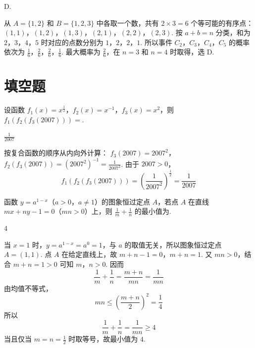 \begin{answer}
D.
\end{answer}

\begin{solution}
从 \(A=\{1,2\}\) 和 \(B=\{1,2,3\}\) 中各取一个数，共有 \(2\times3=6\) 个等可能的有序点：
\((1,1)\)，\((1,2)\)，\((1,3)\)，\((2,1)\)，\((2,2)\)，\((2,3)\).
按 \(a+b=n\) 分类，和为 \(2\)，\(3\)，\(4\)，\(5\) 时对应的点数分别为
\(1\)，\(2\)，\(2\)，\(1\).
所以事件 \(C_2\)，\(C_3\)，\(C_4\)，\(C_5\) 的概率依次为
\(\frac16\)，\(\frac26\)，\(\frac26\)，\(\frac16\).
最大概率为 \(\frac26\)，在 \(n=3\) 和 \(n=4\) 时取得，选 D.
\end{solution}

\section{填空题}

\begin{problem}
设函数 \( f_{1}(x)=x^{\frac{1}{2}} \)，\( f_{2}(x)=x^{-1} \)，\( f_{3}(x)=x^{2} \)，则 \( f_{1}(f_{2}(f_{3}(2007))) = \)\fillinblank{}.
\end{problem}

\begin{answer}
\(\frac{1}{2007}\)
\end{answer}

\begin{solution}
按复合函数的顺序从内向外计算：
\(f_3(2007)=2007^2\)，\(f_2(f_3(2007))=(2007^2)^{-1}=\frac1{2007^2}\).
由于 \(2007>0\)，
\[
f_1(f_2(f_3(2007)))
=\left(\frac1{2007^2}\right)^{\frac{1}{2}}
=\frac1{2007}
\]
\end{solution}

\begin{problem}
函数 \( y = a^{1 - x} \)（\(a > 0\)，\(a \neq 1\)）的图象恒过定点 \(A\)，若点 \(A\) 在直线 \( mx + ny - 1 = 0 \)（\(mn > 0\)）上，则 \( \frac{1}{m} + \frac{1}{n} \) 的最小值为\fillinblank{}.
\end{problem}

\begin{answer}
\(4\)
\end{answer}

\begin{solution}
当 \(x=1\) 时，\(y=a^{1-x}=a^0=1\)，与 \(a\) 的取值无关，所以图象恒过定点 \(A=(1,1)\). 点 \(A\) 在给定直线上，故
\(m+n-1=0\)，\(m+n=1\).
又 \(mn>0\)，结合 \(m+n=1>0\) 可知 \(m\)，\(n>0\). 因而
\[
\frac1m+\frac1n=\frac{m+n}{mn}=\frac1{mn}
\]
由均值不等式，
\[
mn\leqslant\left(\frac{m+n}{2}\right)^2=\frac14
\]
所以
\[
\frac1m+\frac1n=\frac1{mn}\geqslant4
\]
当且仅当 \(m=n=\frac12\) 时取等号，故最小值为 \(4\).
\end{solution}

